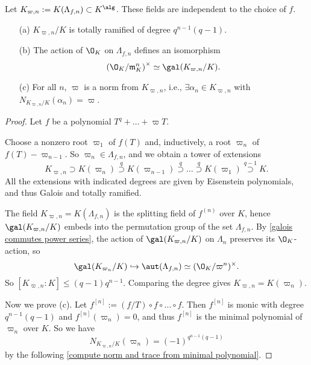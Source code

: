 \begin{theorem}\label{construction of K_{varpi, n}}
    Let $K_{\varpi, n} := K(\Lambda_{f, n})\subset K^\alg$.
    These fields are independent to the choice of $f$.\begin{enumerate}
        \item [(a)] $K_{\varpi, n}/K$ is totally ramified of degree $q^{n-1}(q-1)$.
        \item [(b)] The action of $\O_K$ on $\Lambda_{f, n}$ defines an isomorphism \begin{equation}
            \left( \O_K/\mathfrak{m}_K^n \right)^\times \simeq \gal(K_{\varpi, n}/K).
        \end{equation}
        \item [(c)] For all $n$, $\varpi$ is a norm from $K_{\varpi, n}$, i.e., $\exists\alpha_n\in K_{\varpi, n}$ with $N_{K_{\varpi, n}/K}(\alpha_n) = \varpi$.
    \end{enumerate}
\end{theorem}
\begin{proof}
    Let $f$ be a polynomial $T^q + \dots + \varpi T$.

    Choose a nonzero root $\varpi_1$ of $f(T)$ and, inductively, a root $\varpi_n$ of $f(T) - \varpi_{n-1}$.
    So $\varpi_n\in\Lambda_{f, n}$, and we obtain a tower of extensions \[K_{\varpi, n}\supset K(\varpi_n)\stackrel{q}{\supset} K(\varpi_{n-1}) \stackrel{q}{\supset}\dots\stackrel{q}{\supset} K(\varpi_1)\stackrel{q-1}{\supset} K.\]
    All the extensions with indicated degrees are given by Eisenstein polynomials, and thus Galois and totally ramified.

    The field $K_{\varpi, n} = K(\Lambda_{f, n})$ is the splitting field of $f^{(n)}$ over $K$, hence $\gal(K_{\varpi, n}/K)$ embeds into the permutation group of the set $\Lambda_{f, n}$. By \cref{galois commutes power series}, the action of $\gal(K_{\varpi, n}/K)$ on $\Lambda_n$ preserves its $\O_K$-action, so
    \[\gal(K_{\varpi_n}/K)\hookrightarrow \aut(\Lambda_{f, n})\simeq (\O_K/\varpi^n)^\times.\]
    So $[K_{\varpi, n} : K]\le (q - 1)q^{n-1}$. Comparing the degree gives $K_{\varpi, n} = K(\varpi_n) $.

    Now we prove (c).
    Let $f^{[n]} := (f/T)\circ f\circ\dots\circ f$. Then $f^{[n]}$ is monic with degree $q^{n-1}(q-1)$ and $f^{[n]}(\varpi_n) = 0$, and thus $f^{[n]}$ is the minimal polynomial of $\varpi_n$ over $K$. So we have \[N_{K_{\varpi, n}/K}(\varpi_n) = (-1)^{q^{n-1}(q-1)}\]
    by the following \cref{compute norm and trace from minimal polynomial}.
\end{proof}

